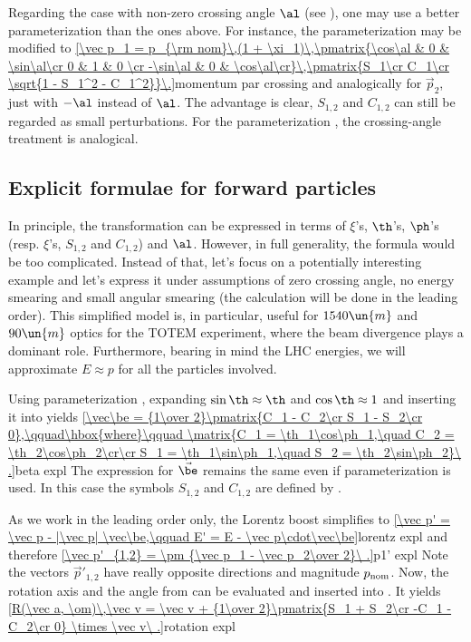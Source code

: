Regarding the case with non-zero crossing angle $\al$ (see ), one may use a better parameterization than the ones above. For instance, the parameterization  may be modified to
\eqref{\vec p_1 = p_{\rm nom}\,(1 + \xi_1)\,\pmatrix{\cos\al & 0 & \sin\al\cr 0 & 1 & 0 \cr -\sin\al & 0 & \cos\al\cr}\,\pmatrix{S_1\cr C_1\cr \sqrt{1 - S_1^2 - C_1^2}}\.}{momentum par crossing}
and analogically for $\vec p_2$, just with $-\al$ instead of $\al$. The advantage is clear, $S_{1,2}$ and $C_{1,2}$ can still be regarded as small perturbations. For the parameterization , the crossing-angle treatment is analogical. 

\subsection{Explicit formulae for forward particles}

In principle, the transformation  can be expressed in terms of $\xi$'s, $\th$'s, $\ph$'s (resp. $\xi$'s, $S_{1,2}$ and $C_{1,2}$) and $\al$. However, in full generality, the formula would be too complicated. Instead of that, let's focus on a potentially interesting example and let's express it under assumptions of zero crossing angle, no energy smearing and small angular smearing (the calculation will be done in the leading order). This simplified model is, in particular, useful for $1540\un{m}$ and $90\un{m}$ optics for the TOTEM experiment, where the beam divergence plays a dominant role. Furthermore, bearing in mind the LHC energies, we will approximate $E\approx p$ for all the particles involved.

Using parameterization , expanding $\sin\th\approx\th$ and $\cos\th\approx 1$ and inserting it into  yields
\eqref{\vec\be = {1\over 2}\pmatrix{C_1 - C_2\cr S_1 - S_2\cr 0},\qquad\hbox{where}\qquad \matrix{C_1 = \th_1\cos\ph_1,\quad C_2 = \th_2\cos\ph_2\cr\cr S_1 = \th_1\sin\ph_1,\quad S_2 = \th_2\sin\ph_2}\ .}{beta expl}
The expression for $\vec\be$ remains the same even if parameterization  is used. In this case the symbols $S_{1,2}$ and $C_{1,2}$ are defined by .

As we work in the leading order only, the Lorentz boost  simplifies to
\eqref{\vec p' = \vec p - |\vec p| \vec\be,\qquad E' = E - \vec p\cdot\vec\be}{lorentz expl}
and therefore
\eqref{\vec p'_{1,2} = \pm {\vec p_1 - \vec p_2\over 2}\ .}{p1' expl}
Note the vectors $\vec p'_{1, 2}$ have really opposite directions and magnitude $p_{\rm nom}$. Now, the rotation axis and the angle from  can be evaluated and inserted into . It yields
\eqref{R(\vec a, \om)\,\vec v = \vec v + {1\over 2}\pmatrix{S_1 + S_2\cr -C_1 - C_2\cr 0} \times \vec v\ .}{rotation expl}

